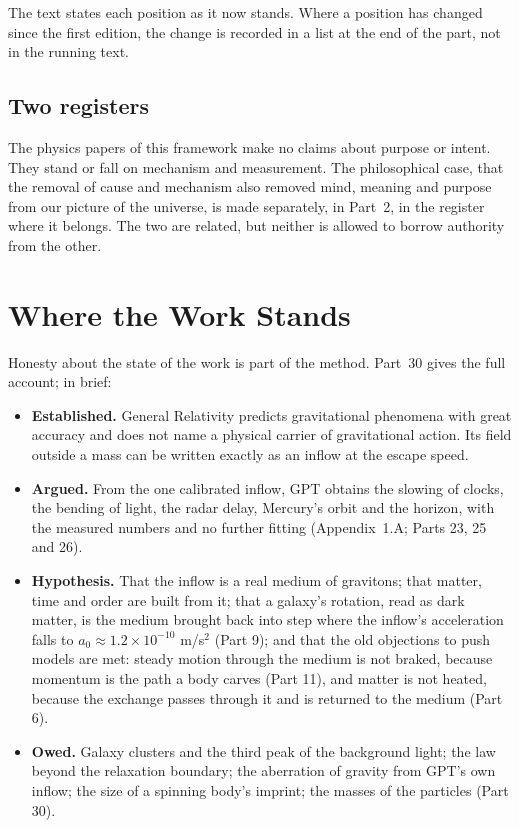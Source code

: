 \statuskey

The text states each position as it now stands. Where a position has changed since the first edition, the change is recorded in a list at the end of the part, not in the running text.

\subsection*{Two registers}

The physics papers of this framework make no claims about purpose or intent. They stand or fall on mechanism and measurement. The philosophical case, that the removal of cause and mechanism also removed mind, meaning and purpose from our picture of the universe, is made separately, in Part~2, in the register where it belongs. The two are related, but neither is allowed to borrow authority from the other.

\section{Where the Work Stands}

Honesty about the state of the work is part of the method. Part~30 gives the full account; in brief:
\begin{itemize}
  \item \textbf{Established.} General Relativity predicts gravitational phenomena with great accuracy and does not name a physical carrier of gravitational action. Its field outside a mass can be written exactly as an inflow at the escape speed.
  \item \textbf{Argued.} From the one calibrated inflow, GPT obtains the slowing of clocks, the bending of light, the radar delay, Mercury's orbit and the horizon, with the measured numbers and no further fitting (Appendix~1.A; Parts 23, 25 and 26). 
  \item \textbf{Hypothesis.} That the inflow is a real medium of gravitons; that matter, time and order are built from it; that a galaxy's rotation, read as dark matter, is the medium brought back into step where the inflow's acceleration falls to $a_0\approx1.2\times10^{-10}$ m/s$^2$ (Part 9); and that the old objections to push models are met: steady motion through the medium is not braked, because momentum is the path a body carves (Part 11), and matter is not heated, because the exchange passes through it and is returned to the medium (Part 6).
  \item \textbf{Owed.} Galaxy clusters and the third peak of the background light; the law beyond the relaxation boundary; the aberration of gravity from GPT's own inflow; the size of a spinning body's imprint; the masses of the particles (Part 30).
\end{itemize}

